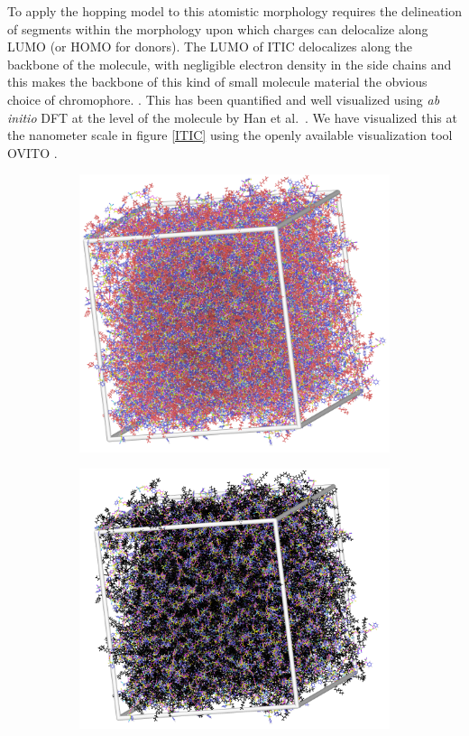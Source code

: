 To apply the hopping model to this atomistic morphology requires the
delineation of segments within the morphology upon which charges can delocalize along LUMO (or 
HOMO for donors).   
The LUMO of ITIC delocalizes along the backbone of the molecule, with
negligible electron density in the side chains and this makes the backbone of this kind of small molecule
material the obvious choice of chromophore.
. This has been quantified and well visualized using \textit{ab
initio} DFT at the level of the molecule by Han et al.~\cite{Han2019}.
We have visualized this at the nanometer scale in figure \ref{ITIC} using the openly
available visualization tool OVITO \cite{Stukowski2010a}. 
\begin{figure}
\centering
\begin{subfigure}{.5\textwidth}
    \includegraphics[width=\textwidth]{figures/ITIC-blackedout-unwrapped-allatom.png}
\end{subfigure}%
\begin{subfigure}{.5\textwidth}
    \includegraphics[width=\textwidth]{figures/ITIC-blackedout-unwrapped.png}

\end{subfigure}
\end{figure}

